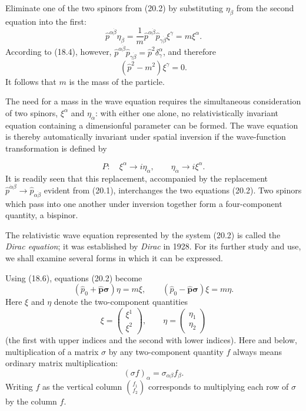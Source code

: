 Eliminate one of the two spinors from (20.2) by substituting $\eta_{\dot\beta}$ from the second equation into the first:
\[
\widehat p^{\alpha\dot\beta}\eta_{\dot\beta}
=\frac1m\widehat p^{\alpha\dot\beta}\widehat p_{\gamma\dot\beta}\xi^\gamma
=m\xi^\alpha.
\]
According to (18.4), however, $\widehat p^{\alpha\dot\beta}\widehat p_{\gamma\dot\beta}=\widehat p^2\delta^\alpha_\gamma$, and therefore
\begin{equation}
(\widehat p^2-m^2)\xi^\gamma=0.
\tag{20.3}
\end{equation}
It follows that $m$ is the mass of the particle.

The need for a mass in the wave equation requires the simultaneous consideration of two spinors, $\xi^\alpha$ and $\eta_{\dot\alpha}$: with either one alone, no relativistically invariant equation containing a dimensionful parameter can be formed. The wave equation is thereby automatically invariant under spatial inversion if the wave-function transformation is defined by

\begin{equation}
P:\quad \xi^\alpha\to i\eta_{\dot\alpha},
\qquad
\eta_{\dot\alpha}\to i\xi^\alpha.
\tag{20.4}
\end{equation}
It is readily seen that this replacement, accompanied by the replacement $\widehat p^{\dot\alpha\beta}\to\widehat p_{\alpha\dot\beta}$ evident from (20.1), interchanges the two equations (20.2). Two spinors which pass into one another under inversion together form a four-component quantity, a bispinor.

The relativistic wave equation represented by the system (20.2) is called the \emph{Dirac equation}; it was established by \emph{Dirac} in 1928. For its further study and use, we shall examine several forms in which it can be expressed.

Using (18.6), equations (20.2) become
\begin{equation}
(\widehat p_0+\widehat{\mathbf p}\boldsymbol\sigma)\eta=m\xi,
\qquad
(\widehat p_0-\widehat{\mathbf p}\boldsymbol\sigma)\xi=m\eta.
\tag{20.5}
\end{equation}
Here $\xi$ and $\eta$ denote the two-component quantities
\begin{equation}
\xi=\begin{pmatrix}\xi^1\\\xi^2\end{pmatrix},
\qquad
\eta=\begin{pmatrix}\eta_{\dot1}\\\eta_{\dot2}\end{pmatrix}
\tag{20.6}
\end{equation}
(the first with upper indices and the second with lower indices). Here and below, multiplication of a matrix $\sigma$ by any two-component quantity $f$ always means ordinary matrix multiplication:
\begin{equation}
(\sigma f)_\alpha=\sigma_{\alpha\beta}f_\beta.
\tag{20.7}
\end{equation}
Writing $f$ as the vertical column $\binom{f_1}{f_2}$ corresponds to multiplying each row of $\sigma$ by the column $f$.


